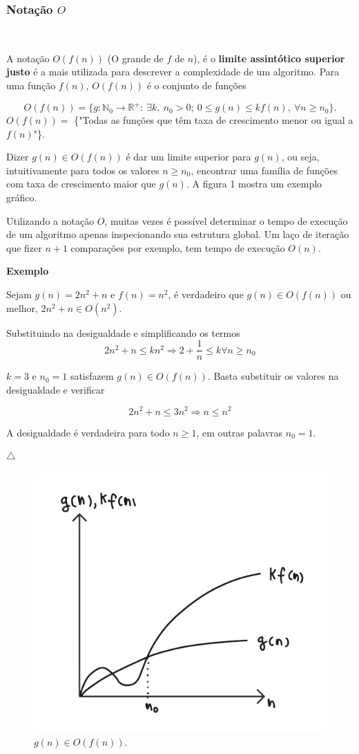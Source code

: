 \subsubsection{Notação $O$}
\

A notação $O(f(n))$ (O grande de $f$ de $n$), é o \textbf{limite assintótico superior justo} é a mais utilizada para descrever a complexidade de um algoritmo. Para uma função $f(n)$, $O(f(n))$ é o conjunto de funções

\[O(f(n)) = \{g: \mathbb{N}_0 \rightarrow \mathbb{R}^{+}: \ \exists k, \ n_0 > 0 ; \ 0\leq g(n) \leq kf(n), \ \forall n \geq n_0\}.\]
$O(f(n))=$ \{"Todas as funções que têm taxa de crescimento menor ou igual a $f(n)$"\}.

Dizer $g(n) \in O(f(n))$ é dar um limite superior para $g(n)$, ou seja, intuitivamente para todos os valores $n\geq n_0$, encontrar uma família de funções com taxa de crescimento maior que $g(n)$. A figura 1 mostra um exemplo gráfico.

Utilizando a notação $O$, muitas vezes é possível determinar o tempo de execução de um algoritmo apenas inspecionando sua estrutura global. Um laço de iteração que fizer $n + 1$ comparações por exemplo, tem tempo de execução $O(n)$.

\textbf{Exemplo}

Sejam $g(n)=2n^2 + n$ e $f(n)=n^2$, é verdadeiro que $g(n)\in O(f(n))$ ou melhor, $2n^2 + n \in O(n^2)$.

Substituindo na desigualdade e simplificando os termos
\[2n^2+n\leq kn^2 \Rightarrow 2 + \frac{1}{n}\leq k \forall n\geq n_0\]

$k=3$ e $n_0=1$ satisfazem $g(n)\in O(f(n))$. Basta substituir os valores na desigualdade e verificar

\[2n^2+n\leq 3n^2 \Rightarrow n\leq n^2\]

A desigualdade é verdadeira para todo $n\geq 1$, em outras palavras $n_0=1$.

{\raggedleft $\bigtriangleup$ \par}

\begin{figure}
  \centering
  \includegraphics[width=0.4\linewidth]{img/O(f(n)).png}
    \caption{$g(n)\in O(f(n))$.}
    \label{O(f(n))}
\end{figure}

